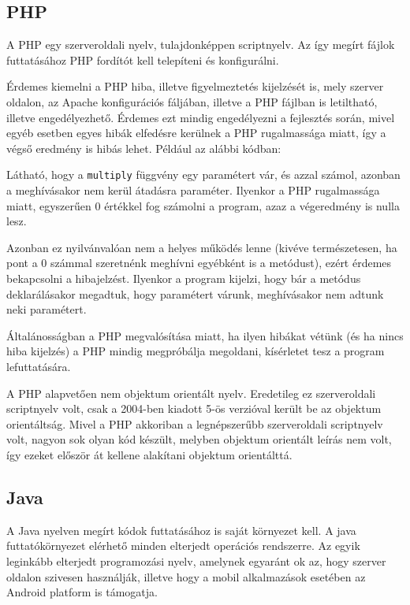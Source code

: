 \subsection{PHP}

A PHP egy szerveroldali nyelv, tulajdonképpen scriptnyelv. Az így megírt fájlok futtatásához PHP fordítót kell telepíteni és konfigurálni.

Érdemes kiemelni a PHP hiba, illetve figyelmeztetés kijelzését is, mely szerver oldalon, az Apache konfigurációs fáljában, illetve a PHP fájlban is letiltható, illetve engedélyezhető. Érdemes ezt mindig engedélyezni a fejlesztés során, mivel egyéb esetben egyes hibák elfedésre kerülnek a PHP rugalmassága miatt, így a végső eredmény is hibás lehet. Például az alábbi kódban:
Látható, hogy a \texttt{multiply} függvény egy paramétert vár, és azzal számol, azonban a meghívásakor nem kerül átadásra paraméter. Ilyenkor a PHP rugalmassága miatt, egyszerűen 0 értékkel fog számolni a program, azaz a végeredmény is nulla lesz.

Azonban ez nyilvánvalóan nem a helyes működés lenne (kivéve természetesen, ha pont a 0 számmal szeretnénk meghívni egyébként is a metódust), ezért érdemes bekapcsolni a hibajelzést. Ilyenkor a program kijelzi, hogy bár a metódus deklarálásakor megadtuk, hogy paramétert várunk, meghívásakor nem adtunk neki paramétert.

Általánosságban a PHP megvalósítása miatt, ha ilyen hibákat vétünk (és ha nincs hiba kijelzés) a PHP mindig megpróbálja megoldani, kísérletet tesz a program lefuttatására.

A PHP alapvetően nem objektum orientált nyelv. Eredetileg ez szerveroldali scriptnyelv volt, csak a 2004-ben kiadott 5-ös verzióval került be az objektum orientáltság. Mivel a PHP akkoriban a legnépszerűbb szerveroldali scriptnyelv volt, nagyon sok olyan kód készült, melyben objektum orientált leírás nem volt, így ezeket először át kellene alakítani objektum orientálttá.

\subsection{Java}

A Java nyelven megírt kódok futtatásához is saját környezet kell. A java futtatókörnyezet elérhető minden elterjedt operációs rendszerre. Az egyik leginkább elterjedt programozási nyelv, amelynek egyaránt ok az, hogy szerver oldalon szivesen használják, illetve hogy a mobil alkalmazások esetében az Android platform is támogatja.

